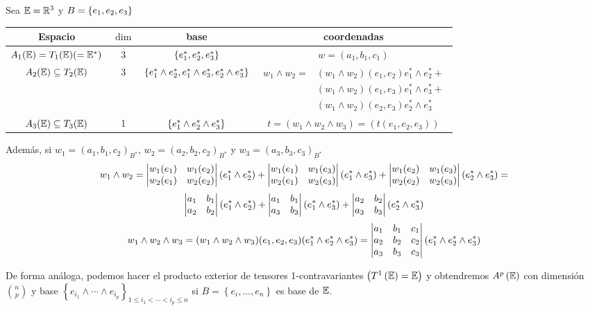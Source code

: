 \begin{example}
	Sea $\mathbb{E}=\mathbb{R}^3$ y $B = \left\{e_1,e_2,e_3\right\}$
	\begin{center}
		\begin{tabular}{|c|c|c|c|}
			\hline
			Espacio & $\dim$ & base & coordenadas \\
			\hline \hline
			$A_1(\mathbb{E})= T_1(\mathbb{E}) (=\mathbb{E}^*)$ & 3 & $\left\{e_1^*,e_2^*,e_3^*\right\}$ &
			$w = (a_1,b_1,c_1)$ \\ \hline $A_2(\mathbb{E}) \subseteq T_2(\mathbb{E})$ & 3 &
			$\left\{e_1^* \wedge e_2^*, e_1^* \wedge e_3^*, e_2^* \wedge e_3^*\right\}$ &
			$\begin{aligned}
				w_1 \wedge w_2 =& (w_1 \wedge w_2)(e_1,e_2) e_1^* \wedge e_2^* + \\
				 & (w_1 \wedge w_2)(e_1,e_3) e_1^* \wedge e_3^* + \\
				 & (w_1 \wedge w_2)(e_2,e_3) e_2^* \wedge e_3^*
			\end{aligned}$ \\
			\hline $A_3(\mathbb{E}) \subseteq T_3(\mathbb{E})$ & 1 &
			$\left\{e_1^* \wedge e_2^* \wedge e_3^*\right\}$ &
			$t =(w_1 \wedge w_2 \wedge w_3) = (t(e_1,e_2,e_3))$ \\ \hline
		\end{tabular}
	\end{center}
	Además, si $w_1=(a_1,b_1,c_2)_{B^*}$, $w_2=(a_2,b_2,c_2)_{B^*}$ y
	$w_3=(a_3,b_3,c_3)_{B^*}$
	\[
		w_1 \wedge w_2 = \begin{vmatrix}w_1(e_1) & w_1(e_2) \\ w_2(e_1) & w_2(e_2)\end{vmatrix}
		(e_1^* \wedge e_2^*) + \begin{vmatrix}w_1(e_1) & w_1(e_3) \\ w_2(e_1) & w_2(e_3)\end{vmatrix}
        (e_1^* \wedge e_3^*) + \begin{vmatrix}w_1(e_2) & w_1(e_3) \\ w_2(e_2) & w_2(e_3)\end{vmatrix}
        (e_2^* \wedge e_3^*) =
    \]
    \[
		\begin{vmatrix}a_1 & b_1 \\ a_2 & b_2\end{vmatrix}(e_1^* \wedge e_2^*) +
		\begin{vmatrix}a_1 & b_1 \\ a_3 & b_3\end{vmatrix}(e_1^* \wedge e_3^*)
		+ \begin{vmatrix}a_2 & b_2 \\ a_3 & b_3\end{vmatrix}(e_2^* \wedge e_3^*)
	\]
	\[
		w_1 \wedge w_2 \wedge w_3 = (w_1 \wedge w_2 \wedge w_3)	(e_1,e_2,e_3)
		(e_1^* \wedge e_2^* \wedge e_3^*) =
		\begin{vmatrix}a_1 & b_1 & c_1 \\ a_2 & b_2 & c_2 \\ a_3 & b_3 & c_3\end{vmatrix}
		(e_1^* \wedge e_2^* \wedge e_3^*)
	\]
\end{example}

\begin{obs}
	De forma análoga, podemos hacer el producto exterior de tensores 1-contravariantes $\left( T^1 \left( \mathbb{E} \right) = \mathbb{E} \right)$
	y obtendremos $A^p\left( \mathbb{E} \right)$ con dimensión $\binom{n}{p}$ y base \break $\left\{ e_{i_1}
	\wedge \cdots \wedge e_{i_p} \right\}_{1 \leq i_1 < \cdots < i_p \leq n}$ si $B=\left\{e_i, \dots , e_n\right\}$ es base de $\mathbb{E}$.
\end{obs}

